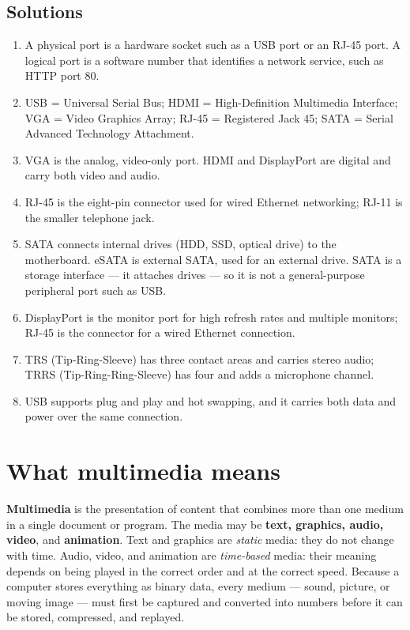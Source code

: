 \subsection*{Solutions}
\begingroup\small
\begin{enumerate}[label=\arabic*.]
  \item A physical port is a hardware socket such as a USB port or an RJ-45
    port. A logical port is a software number that identifies a network
    service, such as HTTP port 80.
  \item USB = Universal Serial Bus; HDMI = High-Definition Multimedia
    Interface; VGA = Video Graphics Array; RJ-45 = Registered Jack 45;
    SATA = Serial Advanced Technology Attachment.
  \item VGA is the analog, video-only port. HDMI and DisplayPort are digital
    and carry both video and audio.
  \item RJ-45 is the eight-pin connector used for wired Ethernet networking;
    RJ-11 is the smaller telephone jack.
  \item SATA connects internal drives (HDD, SSD, optical drive) to the
    motherboard. eSATA is external SATA, used for an external drive. SATA is a
    storage interface --- it attaches drives --- so it is not a
    general-purpose peripheral port such as USB.
  \item DisplayPort is the monitor port for high refresh rates and multiple
    monitors; RJ-45 is the connector for a wired Ethernet connection.
  \item TRS (Tip-Ring-Sleeve) has three contact areas and carries stereo
    audio; TRRS (Tip-Ring-Ring-Sleeve) has four and adds a microphone channel.
  \item USB supports plug and play and hot swapping, and it carries both data
    and power over the same connection.
\end{enumerate}
\endgroup

\section{What multimedia means}
\textbf{Multimedia} is the presentation of content that combines more than
one medium in a single document or program. The media may be \textbf{text,
graphics, audio, video}, and \textbf{animation}. Text and graphics are
\emph{static} media: they do not change with time. Audio, video, and animation
are \emph{time-based} media: their meaning depends on being played in the
correct order and at the correct speed. Because a computer stores everything
as binary data, every medium --- sound, picture, or moving image --- must
first be captured and converted into numbers before it can be stored,
compressed, and replayed.

